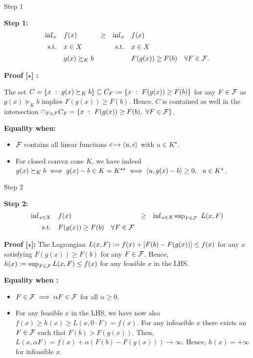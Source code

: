 \documentclass[9pt]{beamer}
\begin{document}
\begin{frame}{Step 1}

  \textbf{Step 1:}
  \[
    \begin{array}{rlcrl}
      \inf_x & f(x)  & \geq & \inf_x & f(x) \\[0.5em]
      \mathrm{s.t.} & x\in X & & \mathrm{s.t.} & x\in X \\[0.5em]
               & g(x) \succeq_{K} b & & & F(g(x)) \geq F(b) \quad \forall F\in \mathcal F.  \\
    \end{array}
  \]

  \vfill
  \textbf{Proof [$\star$] :}

  The set $C = \left\{ x\ : \ g(x) \succeq_{K} b \right\} \subseteq C_F := \left\{ x\ : \ F(g(x))\geq F(b) \right\}$ for any $F\in \mathcal F$ as $g(x)\succeq_{K} b$ implies $F(g(x))\geq F(b)$. Hence,
  $C$ is contained as well in the intersection $\cap_{F\in \mathcal F} C_F = \left\{ x\ : \ F(g(x))\geq F(b),~\forall F \in \mathcal F \right\}$.
  
  \vfill

  \textbf{Equality when:}
  \begin{itemize}
  \item<2-> $\mathcal F$ contains all linear functions $c\mapsto \left<u, c\right>$ with $u\in K^\star$.

  \item<3-> For closed convex cone $K$, we have indeed $g(x)\succeq_{K} b \iff g(x)- b\in K=K^{\star\star} \iff \left<u, g(x)-b\right>\geq 0, ~~u\in K^\star$.
  \end{itemize}
  
\end{frame}

\begin{frame}{Step 2}

  \textbf{Step 2:}
  \[
    \begin{array}{rlcr}
      \inf_{x\in X} & f(x)  & \geq & \inf_{x\in X} \sup_{F\in \mathcal F}~L(x, F) \\[0.5em]
      \mathrm{s.t.} & F(g(x)) \geq F(b) \quad \forall F\in \mathcal F   & & \\
    \end{array}
  \]

  \vfill
  
  \textbf{Proof [$\star$]:}  
  The Lagrangian
  \(
  L(x, F) := f(x) + [F(b) - F(g(x))] \leq f(x)
  \)
  for any $x$ satisfying $F(g(x))\geq F(b)$ for any $F\in \mathcal F$. Hence, $h(x) := \sup_{F\in \mathcal F} L(x, F) \leq f(x)$ for any feasible $x$ in the LHS.
    
  \vfill
  \textbf{Equality when :}
  \begin{itemize}
  \item<2-> $F \in \mathcal F \implies \alpha F \in \mathcal F$ for all $\alpha \geq 0$.
  \item<3-> For any feasible $x$ in the LHS, we have now also $f(x)\geq h(x) \geq L(x, 0\cdot F) = f(x)$. For any infeasible $x$ there exists an $F\in\mathcal F$ such that $F(b) > F(g(x))$. Then, $L(x, \alpha F) = f(x) + \alpha \left(F(b) -F(g(x))\right) \to \infty$. Hence, $h(x)=+\infty$ for infeasible $x$.
  \end{itemize}
  
\end{frame}
\end{document}
